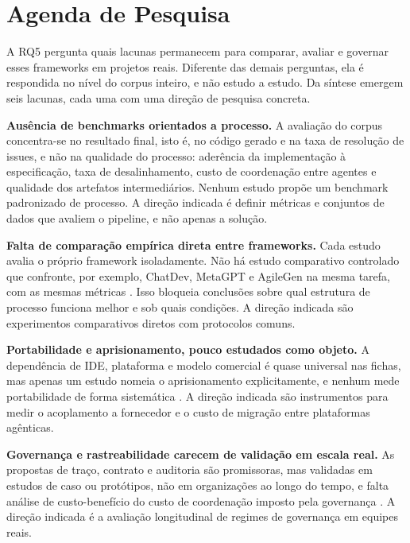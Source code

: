 \section{Agenda de Pesquisa}

A RQ5 pergunta quais lacunas permanecem para comparar, avaliar e governar esses frameworks em projetos reais. Diferente das demais perguntas, ela é respondida no nível do corpus inteiro, e não estudo a estudo. Da síntese emergem seis lacunas, cada uma com uma direção de pesquisa concreta.

\noindent\textbf{Ausência de benchmarks orientados a processo.} A avaliação do corpus concentra-se no resultado final, isto é, no código gerado e na taxa de resolução de issues, e não na qualidade do processo: aderência da implementação à especificação, taxa de desalinhamento, custo de coordenação entre agentes e qualidade dos artefatos intermediários. Nenhum estudo propõe um benchmark padronizado de processo. A direção indicada é definir métricas e conjuntos de dados que avaliem o pipeline, e não apenas a solução.

\noindent\textbf{Falta de comparação empírica direta entre frameworks.} Cada estudo avalia o próprio framework isoladamente. Não há estudo comparativo controlado que confronte, por exemplo, ChatDev, MetaGPT e AgileGen na mesma tarefa, com as mesmas métricas \cite{ChenQian2023,SiruiHong2023,SaiZhang2025}. Isso bloqueia conclusões sobre qual estrutura de processo funciona melhor e sob quais condições. A direção indicada são experimentos comparativos diretos com protocolos comuns.

\noindent\textbf{Portabilidade e aprisionamento, pouco estudados como objeto.} A dependência de IDE, plataforma e modelo comercial é quase universal nas fichas, mas apenas um estudo nomeia o aprisionamento explicitamente, e nenhum mede portabilidade de forma sistemática \cite{SeyedmoeinMohsenimofidi2025}. A direção indicada são instrumentos para medir o acoplamento a fornecedor e o custo de migração entre plataformas agênticas.

\noindent\textbf{Governança e rastreabilidade carecem de validação em escala real.} As propostas de traço, contrato e auditoria são promissoras, mas validadas em estudos de caso ou protótipos, não em organizações ao longo do tempo, e falta análise de custo-benefício do custo de coordenação imposto pela governança \cite{Paduraru2026,Merchant2025,Watfa2026,Macedo2026}. A direção indicada é a avaliação longitudinal de regimes de governança em equipes reais.


